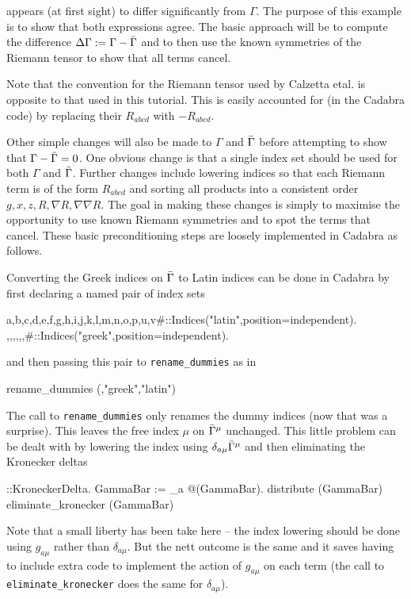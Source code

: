\documentclass[a4paper,12pt]{article}
\numberwithin{equation}{section}%
\begin{document}
appears (at first sight) to differ significantly from $\Gamma$. The purpose of this example
is to show that both expressions agree. The basic approach will be to compute the difference
$\Delta\Gamma:=\Gamma - {\bar{\Gamma}}$ and to then use the known symmetries of the Riemann
tensor to show that all terms cancel.

Note that the convention for the Riemann tensor used by Calzetta etal. is opposite to that
used in this tutorial. This is easily accounted for (in the Cadabra code) by replacing their
$R_{abcd}$ with $-R_{abcd}$.

Other simple changes will also be made to $\Gamma$ and ${\bar{\Gamma}}$ before attempting to show
that $\Gamma -{\bar{\Gamma}} = 0$. One obvious change is that a single index set should be used
for both $\Gamma$ and ${\bar{\Gamma}}$. Further changes include lowering indices so that each
Riemann term is of the form $R_{abcd}$ and sorting all products into a consistent order
$g,x,z,R,\nabla R,\nabla\nabla R$. The goal in making these changes is simply to maximise
the opportunity to use known Riemann symmetries and to spot the terms that cancel. These
basic preconditioning steps are loosely implemented in Cadabra as follows.

Converting the Greek indices on ${\bar{\Gamma}}$ to Latin indices can be done in Cadabra by
first declaring a named pair of index sets
\begin{cadabra}[numbers=none]
   {a,b,c,d,e,f,g,h,i,j,k,l,m,n,o,p,u,v#}::Indices("latin",position=independent).
   {\mu,\nu,\rho,\sigma,\tau,\lambda,\xi#}::Indices("greek",position=independent).
\end{cadabra}
and then passing this pair to \verb|rename_dummies| as in
\begin{cadabra}[numbers=none]
   rename_dummies (\GammaBar,"greek","latin")
\end{cadabra}

The call to \verb|rename_dummies| only renames the dummy indices (now that was a surprise).
This leaves the free index $\mu$ on ${\bar{\Gamma}}^{\mu}$ unchanged. This little problem can be
dealt with by lowering the index using $\delta_{a\mu} {\bar{\Gamma}}^{\mu}$ and then eliminating
the Kronecker deltas
\begin{cadabra}[numbers=none]
   \delta{#}::KroneckerDelta.
   GammaBar := \delta_{a \mu} @(GammaBar).
   distribute (GammaBar)
   eliminate_kronecker (GammaBar)
\end{cadabra}
Note that a small liberty has been take here -- the index lowering should be done using
$g_{a \mu}$ rather than $\delta_{a\mu}$. But the nett outcome is the same and it saves
having to include extra code to implement the action of $g_{a\mu}$ on each term (the call to
\verb|eliminate_kronecker| does the same for $\delta_{a\mu}$).
\end{document}
